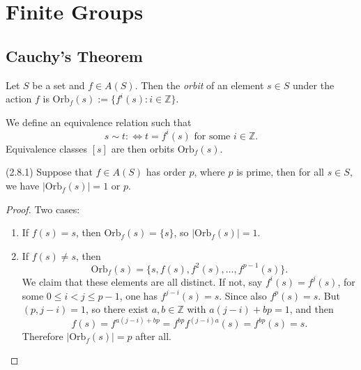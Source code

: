 
\section{Finite Groups}
\subsection{Cauchy's Theorem}

\begin{definition}
	Let $S$ be a set and $f \in A(S)$. Then the \textit{orbit} of an element $s \in S$ under the action $ f$ is $\text{Orb}_f(s) := \{f^i(s): i \in \mathbb{Z}\} $.
\end{definition}

We define an equivalence relation such that \[
	s \sim t :\iff t = f^i(s) \text{ for some } i \in \mathbb{Z}
.\] 
Equivalence classes $[s]$ are then orbits $\text{Orb}_f(s)$.

\begin{lemma}
	(2.8.1)
	Suppose that $f \in A(S)$ has order $p$, where $p$ is prime, then for all $s \in S$, we have $\left| \text{Orb}_f(s) \right| = 1 \text{ or } p$.
\end{lemma}
\begin{proof}
	Two cases:
	\begin{enumerate}
		\item If $f(s) = s$, then $\text{Orb}_f(s) = \{s\}$, so $\left| \text{Orb}_f(s) \right|  = 1$.
		\item If $f(s) \neq s$, then \[
			\text{Orb}_f(s) =
			\{s, f(s), f^2(s), \ldots, f^{p-1}(s)\} 
		.\] 
		We claim that these elements are all distinct. If not, say $f^i\left( s \right)  =f^j(s)$, for some $0 \le i < j \le p-1$, one has $f^{j-i}(s) = s$. Since also $f^p(s) = s$. But $(p, j-i) = 1$, so there exist $a, b \in \mathbb{Z}$ with $a(j-i) + bp = 1$, and then \[
			f(s) = f^{a(j-i)+bp } = f^{bp}f^{(j-i)a}(s) = f^{bp}(s)=s
		.\] 
		Therefore $\left| \text{Orb}_f(s) \right|  = p$ after all.
	\end{enumerate}
\end{proof}

